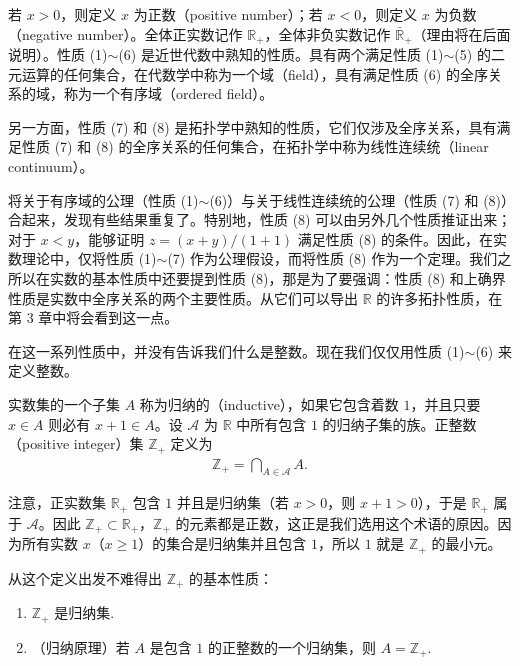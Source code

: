 \documentclass[../../main.tex]{subfiles}
\begin{document}
若 $x > 0$，则定义 $x$ 为正数（positive number）；若 $x < 0$，则定义 $x$ 为负数（negative number）。全体正实数记作 $\mathbb{R}_{+}$，全体非负实数记作 $\bar{\mathbb{R}}_{+}$（理由将在后面说明）。性质 (1)$\sim$(6) 是近世代数中熟知的性质。具有两个满足性质 (1)$\sim$(5) 的二元运算的任何集合，在代数学中称为一个域（field），具有满足性质 (6) 的全序关系的域，称为一个有序域（ordered field）。

另一方面，性质 (7) 和 (8) 是拓扑学中熟知的性质，它们仅涉及全序关系，具有满足性质 (7) 和 (8) 的全序关系的任何集合，在拓扑学中称为线性连续统（linear continuum）。

将关于有序域的公理（性质 (1)$\sim$(6)）与关于线性连续统的公理（性质 (7) 和 (8)）合起来，发现有些结果重复了。特别地，性质 (8) 可以由另外几个性质推证出来；对于 $x < y$，能够证明 $z = (x + y)/(1 + 1)$ 满足性质 (8) 的条件。因此，在实数理论中，仅将性质 (1)$\sim$(7) 作为公理假设，而将性质 (8) 作为一个定理。我们之所以在实数的基本性质中还要提到性质 (8)，那是为了要强调：性质 (8) 和上确界性质是实数中全序关系的两个主要性质。从它们可以导出 $\mathbb{R}$ 的许多拓扑性质，在第 3 章中将会看到这一点。

在这一系列性质中，并没有告诉我们什么是整数。现在我们仅仅用性质 (1)$\sim$(6) 来定义整数。

\begin{definition}[归纳集与正整数]\label{definition:ch01-归纳集}
实数集的一个子集 $A$ 称为归纳的（inductive），如果它包含着数 $1$，并且只要 $x \in A$ 则必有 $x + 1 \in A$。设 $\mathcal{A}$ 为 $\mathbb{R}$ 中所有包含 $1$ 的归纳子集的族。正整数（positive integer）集 $\mathbb{Z}_{+}$ 定义为
\begin{align}
\mathbb{Z}_{+} = \bigcap_{A \in \mathcal{A}} A.\label{align:ch01-正整数定义}
\end{align}
\end{definition}

注意，正实数集 $\mathbb{R}_{+}$ 包含 $1$ 并且是归纳集（若 $x > 0$，则 $x + 1 > 0$），于是 $\mathbb{R}_{+}$ 属于 $\mathcal{A}$。因此 $\mathbb{Z}_{+} \subset \mathbb{R}_{+}$，$\mathbb{Z}_{+}$ 的元素都是正数，这正是我们选用这个术语的原因。因为所有实数 $x$（$x \geqslant 1$）的集合是归纳集并且包含 $1$，所以 $1$ 就是 $\mathbb{Z}_{+}$ 的最小元。

从这个定义出发不难得出 $\mathbb{Z}_{+}$ 的基本性质：
\begin{enumerate}[(1)]
\item $\mathbb{Z}_{+}$ 是归纳集.
\item（归纳原理）若 $A$ 是包含 $1$ 的正整数的一个归纳集，则 $A = \mathbb{Z}_{+}$.
\end{enumerate}
\end{document}
